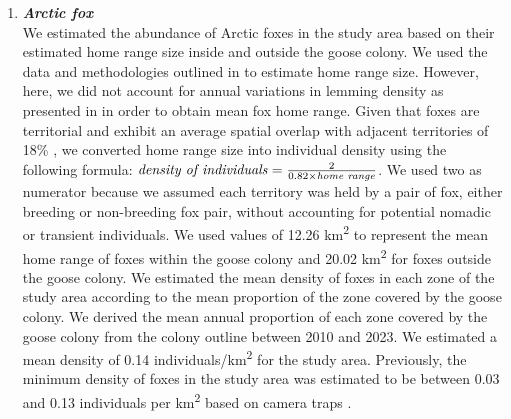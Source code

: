 \documentclass[a4paper,twoside,12pt]{article}
\begin{document}
\begin{enumerate}[label=\alph*.]
                \item[] \textit{\textbf{Arctic fox}}\\
                We estimated the abundance of Arctic foxes in the study area based on their estimated home range size inside and outside the goose colony. We used the data and methodologies outlined in \citet{dulude2023} to estimate home range size. However, here, we did not account for annual variations in lemming density as presented in \citet{dulude2023} in order to obtain mean fox home range. Given that foxes are territorial and exhibit an average spatial overlap with adjacent territories of 18\% \citep{clermont2021}, we converted home range size into individual density using the following formula: $\text{\textit{density of individuals}}= \frac{2}{0.82\times \text{\textit{home range}}}$. We used two as numerator because we assumed each territory was held by a pair of fox, either breeding or non-breeding fox pair, without accounting for potential nomadic or transient individuals. We used values of 12.26 km\textsuperscript{2} to represent the mean home range of foxes within the goose colony and 20.02 km\textsuperscript{2} for foxes outside the goose colony. We estimated the mean density of foxes in each zone of the study area according to the mean proportion of the zone covered by the goose colony. We derived the mean annual proportion of each zone covered by the goose colony from the colony outline between 2010 and 2023. We estimated a mean density of 0.14 individuals/km\textsuperscript{2} for the study area. Previously, the minimum density of foxes in the study area was estimated to be between 0.03 and 0.13 individuals per km\textsuperscript{2} based on camera traps \citep{royerboutin2015}. 
                \newpage
                        \end{enumerate}
                        
\end{document}
